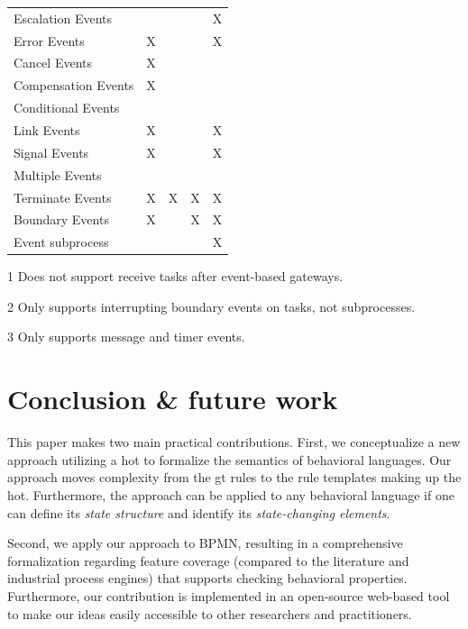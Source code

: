 \documentclass[runningheads]{llncs}
\begin{document}
\begin{table}[htbp]
\begin{threeparttable}
\begin{tabular}{l l l l l}
      Escalation Events & & & & X\\
      Error Events & X & & & X\\
      Cancel Events & X & & &\\
      Compensation Events & X & & &\\
      Conditional Events & & & &\\
      Link Events & X & & & X\\
      Signal Events & X & & & X\\
      Multiple Events &  & & & \\
      Terminate Events & X & X & X & X\\
     Boundary Events & X\tnote{2} & & X\tnote{3} & X\\ %
      Event subprocess &  &  &  & X\\
    \end{tabular}
    \begin{tablenotes}
        \item[1] Does not support receive tasks after event-based gateways.
        \item[2] Only supports interrupting boundary events on tasks, not subprocesses.
        \item[3] Only supports message and timer events.
    \end{tablenotes}
    \end{threeparttable}
\end{table}


\section{Conclusion \& future work} \label{sec:conclusion}
This paper makes two main practical contributions.
First, we conceptualize a new approach utilizing a \gls*{hot} to formalize the semantics of behavioral languages.
Our approach moves complexity from the \gls*{gt} rules to the rule templates making up the \gls*{hot}.
Furthermore, the approach can be applied to any behavioral language if one can define its \textit{state structure} and identify its \textit{state-changing elements}.

Second, we apply our approach to BPMN, resulting in a comprehensive formalization regarding feature coverage (compared to the literature and industrial process engines) that supports checking behavioral properties.
Furthermore, our contribution is implemented in an open-source web-based tool to make our ideas easily accessible to other researchers and practitioners.
\end{document}
